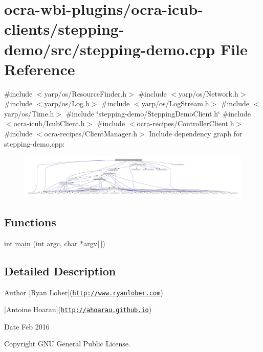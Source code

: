 \hypertarget{stepping-demo_8cpp}{\section{ocra-\/wbi-\/plugins/ocra-\/icub-\/clients/stepping-\/demo/src/stepping-\/demo.cpp \-File \-Reference}
\label{stepping-demo_8cpp}
}
{\ttfamily \#include $<$yarp/os/\-Resource\-Finder.\-h$>$}\*
{\ttfamily \#include $<$yarp/os/\-Network.\-h$>$}\*
{\ttfamily \#include $<$yarp/os/\-Log.\-h$>$}\*
{\ttfamily \#include $<$yarp/os/\-Log\-Stream.\-h$>$}\*
{\ttfamily \#include $<$yarp/os/\-Time.\-h$>$}\*
{\ttfamily \#include \char`\"{}stepping-\/demo/\-Stepping\-Demo\-Client.\-h\char`\"{}}\*
{\ttfamily \#include $<$ocra-\/icub/\-Icub\-Client.\-h$>$}\*
{\ttfamily \#include $<$ocra-\/recipes/\-Controller\-Client.\-h$>$}\*
{\ttfamily \#include $<$ocra-\/recipes/\-Client\-Manager.\-h$>$}\*
\-Include dependency graph for stepping-\/demo.cpp\-:\nopagebreak
\begin{figure}[H]
\begin{center}
\leavevmode
\includegraphics[width=350pt]{stepping-demo_8cpp__incl}
\end{center}
\end{figure}
\subsection*{\-Functions}
\begin{DoxyCompactItemize}
\item 
int \hyperlink{stepping-demo_8cpp_a0ddf1224851353fc92bfbff6f499fa97}{main} (int argc, char $\ast$argv\mbox{[}$\,$\mbox{]})
\end{DoxyCompactItemize}


\subsection{\-Detailed \-Description}
\begin{DoxyAuthor}{\-Author}
\mbox{[}\-Ryan \-Lober\mbox{]}(\href{http://www.ryanlober.com}{\tt http\-://www.\-ryanlober.\-com}) 

\mbox{[}\-Antoine \-Hoarau\mbox{]}(\href{http://ahoarau.github.io}{\tt http\-://ahoarau.\-github.\-io}) 
\end{DoxyAuthor}
\begin{DoxyDate}{\-Date}
\-Feb 2016 
\end{DoxyDate}
\begin{DoxyCopyright}{\-Copyright}
\-G\-N\-U \-General \-Public \-License. 
\end{DoxyCopyright}


